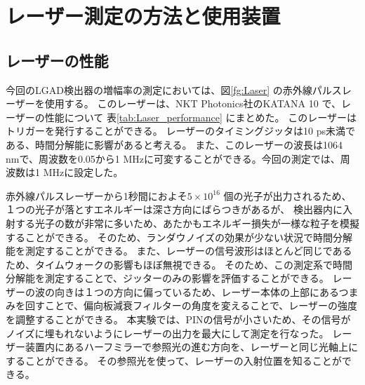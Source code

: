 \section{レーザー測定の方法と使用装置}
\subsection{レーザーの性能}
今回のLGAD検出器の増幅率の測定においては、図\ref{fg:Laser} の赤外線パルスレーザーを使用する。
このレーザーは、NKT Photonics社のKATANA 10 \cite{KATANA10}で、レーザーの性能について 表\ref{tab:Laser_performance} にまとめた。
このレーザーはトリガーを発行することができる。
レーザーのタイミングジッタは10 ps未満である、時間分解能に影響があると考える。
また、このレーザーの波長は1064 nmで、周波数を0.05から1 MHzに可変することができる。今回の測定では、周波数は1 MHzに設定した。

赤外線パルスレーザーから1秒間におよそ$5\times10^{16}$ 個の光子が出力されるため、１つの光子が落とすエネルギーは深さ方向にばらつきがあるが、
検出器内に入射する光子の数が非常に多いため、あたかもエネルギー損失が一様な粒子を模擬することができる。
そのため、ランダウノイズの効果が少ない状況で時間分解能を測定することができる。
また、レーザーの信号波形はほとんど同じであるため、タイムウォークの影響もほぼ無視できる。
そのため、この測定系で時間分解能を測定することで、ジッターのみの影響を評価することができる。
レーザーの波の向きは１つの方向に偏っているため、レーザー本体の上部にあるつまみを回すことで、偏向板減衰フィルターの角度を変えることで、レーザーの強度を調整することができる。
本実験では、PINの信号が小さいため、その信号がノイズに埋もれないようにレーザーの出力を最大にして測定を行なった。
レーザー装置内にあるハーフミラーで参照光の進む方向を、レーザーと同じ光軸上にすることができる。
その参照光を使って、レーザーの入射位置を知ることができる。

